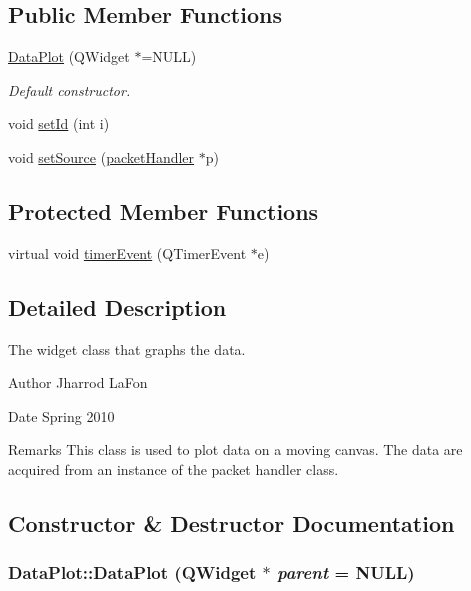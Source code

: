 \subsection*{Public Member Functions}
\begin{DoxyCompactItemize}
\item 
\hyperlink{classDataPlot_a1343acbd6095212532c4315d6e9f1711}{DataPlot} (QWidget $\ast$=NULL)
\begin{DoxyCompactList}\small\item\em Default constructor. \item\end{DoxyCompactList}\item 
void \hyperlink{classDataPlot_ab6af06dfac3585a7dc669ea333a0869d}{setId} (int i)
\item 
void \hyperlink{classDataPlot_aace03b9e68e11042c0fade588e2869a7}{setSource} (\hyperlink{classpacketHandler}{packetHandler} $\ast$p)
\end{DoxyCompactItemize}
\subsection*{Protected Member Functions}
\begin{DoxyCompactItemize}
\item 
virtual void \hyperlink{classDataPlot_a41c9c4bc12d8d3e3abdf893c4fcfad7b}{timerEvent} (QTimerEvent $\ast$e)
\end{DoxyCompactItemize}


\subsection{Detailed Description}
The widget class that graphs the data. \begin{DoxyAuthor}{Author}
Jharrod LaFon 
\end{DoxyAuthor}
\begin{DoxyDate}{Date}
Spring 2010 
\end{DoxyDate}
\begin{DoxyRemark}{Remarks}
This class is used to plot data on a moving canvas. The data are acquired from an instance of the packet handler class. 
\end{DoxyRemark}


\subsection{Constructor \& Destructor Documentation}
\hypertarget{classDataPlot_a1343acbd6095212532c4315d6e9f1711}{
\subsubsection[{DataPlot}]{\setlength{\rightskip}{0pt plus 5cm}DataPlot::DataPlot (QWidget $\ast$ {\em parent} = {\ttfamily NULL})}}
\label{classDataPlot_a1343acbd6095212532c4315d6e9f1711}


